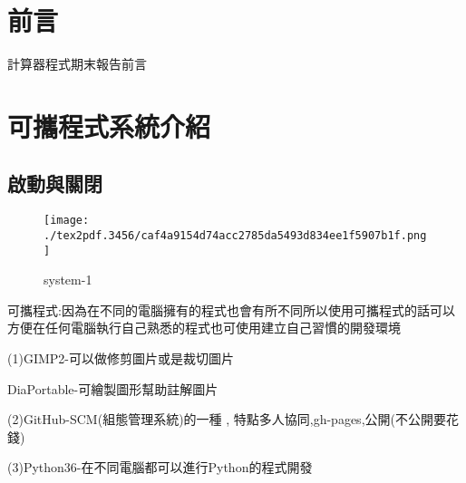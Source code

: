 \documentclass[12pt,,]{report}
\begin{document}
\begingroup
    \renewcommand{\contentsname}{\center 目錄 \addcontentsline{toc}{chapter}{目錄}}
    \renewcommand{\numberline}[1]{~#1\hspace*{1em}}
        \setcounter{tocdepth}{2}
    \tableofcontents
    \newcommand{\lotlabel}{表}
    \renewcommand{\listtablename}{\center 表目錄 \addcontentsline{toc}{chapter}{表目錄}}
    \renewcommand{\numberline}[1]{\lotlabel~#1\hspace*{1em}}
    \listoftables
    \newcommand{\loflabel}{圖}
    \renewcommand{\listfigurename}{\center 圖目錄 \addcontentsline{toc}{chapter}{圖目錄}}
    \renewcommand{\numberline}[1]{\loflabel~#1\hspace*{1em}}
    \listoffigures
\endgroup

\mainmatter
\hypertarget{ux524dux8a00}{%
\chapter{前言}\label{ux524dux8a00}}

計算器程式期末報告前言

\hypertarget{ux53efux651cux7a0bux5f0fux7cfbux7d71ux4ecbux7d39}{%
\chapter{可攜程式系統介紹}\label{ux53efux651cux7a0bux5f0fux7cfbux7d71ux4ecbux7d39}}

\hypertarget{ux555fux52d5ux8207ux95dcux9589}{%
\section{啟動與關閉}\label{ux555fux52d5ux8207ux95dcux9589}}

\begin{figure}
\centering
\texttt{[image: ./tex2pdf.3456/caf4a9154d74acc2785da5493d834ee1f5907b1f.png]}
\caption{system-1\label{fig:格子}}
\end{figure}

可攜程式:因為在不同的電腦擁有的程式也會有所不同所以使用可攜程式的話可以方便在任何電腦執行自己熟悉的程式也可使用建立自己習慣的開發環境

(1)GIMP2-可以做修剪圖片或是裁切圖片

DiaPortable-可繪製圖形幫助註解圖片

(2)GitHub-SCM(組態管理系統)的一種 ,
特點多人協同,gh-pages,公開(不公開要花錢)

(3)Python36-在不同電腦都可以進行Python的程式開發
\end{document}

